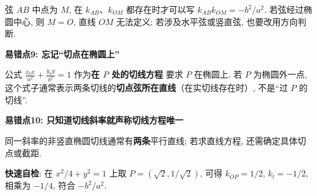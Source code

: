 \begin{trapbox}
弦 $AB$ 中点为 $M$, 在 $k_{AB}$、$k_{OM}$ 都存在时才可以写
$k_{AB}k_{OM}=-b^2/a^2$. 若弦经过椭圆中心, 则 $M=O$,
直线 $OM$ 无法定义; 若涉及水平弦或竖直弦, 也要改用方向判断.

\textbf{易错点9: 忘记“切点在椭圆上”}

公式 $\frac{x_0x}{a^2}+\frac{y_0y}{b^2}=1$ 作为\textbf{在 $P$ 处的切线方程}
要求 $P$ 在椭圆上. 若 $P$ 为椭圆外一点,
这个式子通常表示两条切线的\textbf{切点弦所在直线}（在实切线存在时）, 不是“过 $P$ 的切线”.

\textbf{易错点10: 只知道切线斜率就声称切线方程唯一}

同一斜率的非竖直椭圆切线通常有\textbf{两条}平行直线;
若求直线方程, 还需确定具体切点或截距.

\textbf{快速自检}: 在 $x^2/4+y^2=1$ 上取
$P=(\sqrt2,1/\sqrt2)$, 可得 $k_{OP}=1/2$, $k_l=-1/2$,
相乘为 $-1/4$, 符合 $-b^2/a^2$.
\end{trapbox}
